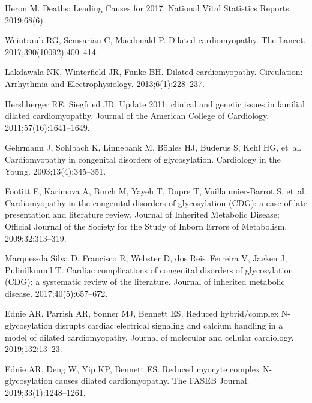 \documentclass[10pt,letterpaper]{article}
\begin{document}
\begin{thebibliography}{10}

Heron M.
\newblock Deaths: Leading Causes for 2017.
\newblock National Vital Statistics Reports. 2019;68(6).

Weintraub RG, Semsarian C, Macdonald P.
\newblock Dilated cardiomyopathy.
\newblock The Lancet. 2017;390(10092):400--414.

Lakdawala NK, Winterfield JR, Funke BH.
\newblock Dilated cardiomyopathy.
\newblock Circulation: Arrhythmia and Electrophysiology. 2013;6(1):228--237.

Hershberger RE, Siegfried JD.
\newblock Update 2011: clinical and genetic issues in familial dilated
  cardiomyopathy.
\newblock Journal of the American College of Cardiology.
  2011;57(16):1641--1649.

Gehrmann J, Sohlbach K, Linnebank M, B{\"o}hles HJ, Buderus S, Kehl HG, et~al.
\newblock Cardiomyopathy in congenital disorders of glycosylation.
\newblock Cardiology in the Young. 2003;13(4):345--351.

Footitt E, Karimova A, Burch M, Yayeh T, Dupre T, Vuillaumier-Barrot S, et~al.
\newblock Cardiomyopathy in the congenital disorders of glycosylation (CDG): a
  case of late presentation and literature review.
\newblock Journal of Inherited Metabolic Disease: Official Journal of the
  Society for the Study of Inborn Errors of Metabolism. 2009;32:313--319.

Marques-da Silva D, Francisco R, Webster D, dos Reis~Ferreira V, Jaeken J,
  Pulinilkunnil T.
\newblock Cardiac complications of congenital disorders of glycosylation (CDG):
  a systematic review of the literature.
\newblock Journal of inherited metabolic disease. 2017;40(5):657--672.

Ednie AR, Parrish AR, Sonner MJ, Bennett ES.
\newblock Reduced hybrid/complex N-glycosylation disrupts cardiac electrical
  signaling and calcium handling in a model of dilated cardiomyopathy.
\newblock Journal of molecular and cellular cardiology. 2019;132:13--23.

Ednie AR, Deng W, Yip KP, Bennett ES.
\newblock Reduced myocyte complex N-glycosylation causes dilated
  cardiomyopathy.
\newblock The FASEB Journal. 2019;33(1):1248--1261.


\end{thebibliography}
\end{document}
